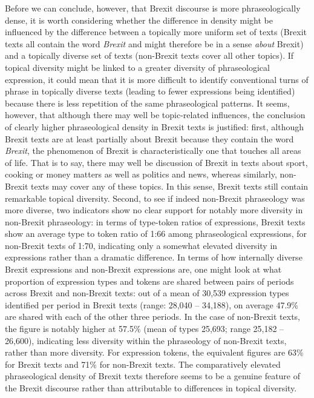 \documentclass[12pt]{article}
\newenvironment{styleStandard}{\setlength\leftskip{0cm}\setlength\rightskip{0cm plus 1fil}\setlength\parindent{0cm}\setlength\parfillskip{0pt plus 1fil}\setlength\parskip{0in plus 1pt}\writerlistparindent\writerlistleftskip\leavevmode\normalfont\normalsize\writerlistlabel\ignorespaces}{\unskip\vspace{0.111in plus 0.0111in}\par}
\newcommand\writerlistleftskip{}
\newcommand\writerlistparindent{}
\newcommand\writerlistlabel{}
\begin{document}
\begin{styleStandard}
Before we can conclude, however, that Brexit discourse is more phraseologically dense, it is worth considering whether the difference in density might be influenced by the difference between a topically more uniform set of texts (Brexit texts all contain the word \textit{Brexit} and might therefore be in a sense \textit{about} Brexit) and a topically diverse set of texts (non-Brexit texts cover all other topics). If topical diversity might be linked to a greater diversity of phraseological expression, it could mean that it is more difficult to identify conventional turns of phrase in topically diverse texts (leading to fewer expressions being identified) because there is less repetition of the same phraseological patterns. It seems, however, that although there may well be topic-related influences, the conclusion of clearly higher phraseological density in Brexit texts is justified: first, although Brexit texts are at least partially about Brexit because they contain the word \textit{Brexit}, the phenomenon of Brexit is characteristically one that touches all areas of life. That is to say, there may well be discussion of Brexit in texts about sport, cooking or money matters as well as politics and news, whereas similarly, non-Brexit texts may cover any of these topics. In this sense, Brexit texts still contain remarkable topical diversity. Second, to see if indeed non-Brexit phraseology was more diverse, two indicators show no clear support for notably more diversity in non-Brexit phraseology: in terms of type-token ratios of expressions, Brexit texts show an average type to token ratio of 1:66 among phraseological expressions, for non-Brexit texts of 1:70, indicating only a somewhat elevated diversity in expressions rather than a dramatic difference. In terms of how internally diverse Brexit expressions and non-Brexit expressions are, one might look at what proportion of expression types and tokens are shared between pairs of periods across Brexit and non-Brexit texts: out of a mean of 30,539 expression types identified per period in Brexit texts (range: 28,040 – 34,188), on average 47.9\% are shared with each of the other three periods. In the case of non-Brexit texts, the figure is notably higher at 57.5\% (mean of types 25,693; range 25,182 – 26,600), indicating less diversity within the phraseology of non-Brexit texts, rather than more diversity. For expression tokens, the equivalent figures are 63\% for Brexit texts and 71\% for non-Brexit texts. The comparatively elevated phraseological density of Brexit texts therefore seems to be a genuine feature of the Brexit discourse rather than attributable to differences in topical diversity.
\end{styleStandard}
\end{document}
